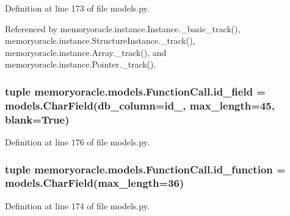 Definition at line 173 of file models.\+py.



Referenced by memoryoracle.\+instance.\+Instance.\+\_\+basic\+\_\+track(), memoryoracle.\+instance.\+Structure\+Instance.\+\_\+track(), memoryoracle.\+instance.\+Array.\+\_\+track(), and memoryoracle.\+instance.\+Pointer.\+\_\+track().

\hypertarget{classmemoryoracle_1_1models_1_1FunctionCall_a88f5f9c5017592289b962bc357b6436b}{}
\subsubsection[{id\+\_\+field}]{\setlength{\rightskip}{0pt plus 5cm}tuple memoryoracle.\+models.\+Function\+Call.\+id\+\_\+field = models.\+Char\+Field(db\+\_\+column=\textquotesingle{}id\+\_\+\textquotesingle{}, max\+\_\+length=45, blank=True)\hspace{0.3cm}{\ttfamily [static]}}\label{classmemoryoracle_1_1models_1_1FunctionCall_a88f5f9c5017592289b962bc357b6436b}


Definition at line 176 of file models.\+py.

\hypertarget{classmemoryoracle_1_1models_1_1FunctionCall_a6c2f0c5abdeaed19f1ceea33dbe1f5ea}{}
\subsubsection[{id\+\_\+function}]{\setlength{\rightskip}{0pt plus 5cm}tuple memoryoracle.\+models.\+Function\+Call.\+id\+\_\+function = models.\+Char\+Field(max\+\_\+length=36)\hspace{0.3cm}{\ttfamily [static]}}\label{classmemoryoracle_1_1models_1_1FunctionCall_a6c2f0c5abdeaed19f1ceea33dbe1f5ea}


Definition at line 174 of file models.\+py.

\hypertarget{classmemoryoracle_1_1models_1_1FunctionCall_ab9399836b9c41f224159af0f9c862380}{}

